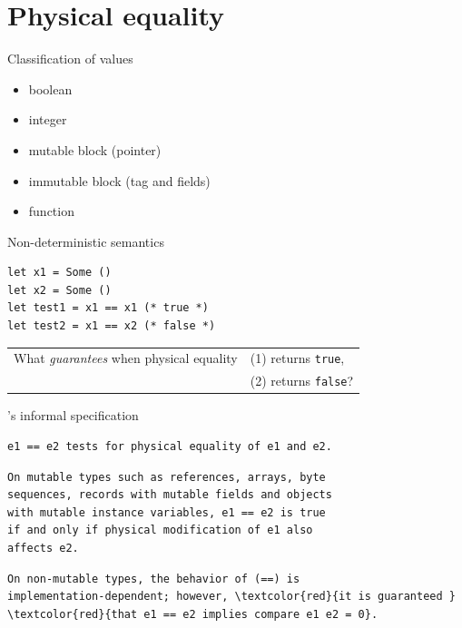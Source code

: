 \section{Physical equality}

\begin{frame}{Classification of \Zoo values}
\LARGE
\begin{itemize}
  \item boolean
  \item integer
  \item mutable block (pointer)
  \item immutable block (tag and fields)
  \item function
\end{itemize}
\end{frame}

\begin{frame}[fragile]{Non-deterministic semantics}
\Large
\begin{verbatim}
let x1 = Some ()
let x2 = Some ()
let test1 = x1 == x1 (* true *)
let test2 = x1 == x2 (* false *)
\end{verbatim}
\vfill
\begin{tabular}{ll}
    What \emph{guarantees} when physical equality
    &
    (1) returns \texttt{true},
  \\
    &
    (2) returns \texttt{false}?
\end{tabular}
\end{frame}

\begin{frame}[fragile]{\OCaml's informal specification}
\Large
\begin{Verbatim}[commandchars=\\\{\}]
e1 == e2 tests for physical equality of e1 and e2.
\end{Verbatim}
\vfill
{ 
  \color{lightgray}
  \begin{Verbatim}[commandchars=\\\{\}]
On mutable types such as references, arrays, byte
sequences, records with mutable fields and objects 
with mutable instance variables, e1 == e2 is true 
if and only if physical modification of e1 also 
affects e2.
  \end{Verbatim}
}
\vfill
\begin{Verbatim}[commandchars=\\\{\}]
On non-mutable types, the behavior of (==) is 
implementation-dependent; however, \textcolor{red}{it is guaranteed }
\textcolor{red}{that e1 == e2 implies compare e1 e2 = 0}.
\end{Verbatim}
\end{frame}

